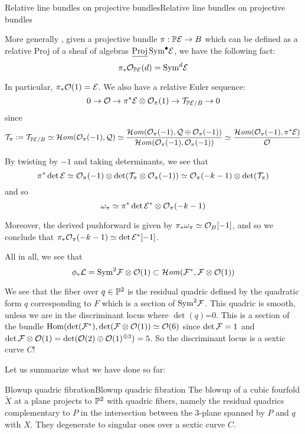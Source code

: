 \begin{remark}{Relative line bundles on projective bundles}{Relative line bundles on projective bundles}

    More generally \cite[Remark~13.36]{Wedhorn}, given a projective bundle $\pi:\P\calE \rightarrow B$ which can be defined as a relative Proj of a sheaf of algebras $\underline{\Proj}\, \mathrm{Sym}^\bullet \calE$, we have the following fact: $$\pi_* \O_{\P\calE}(d)=\mathrm{Sym}^d \calE$$ 

    In particular, $\pi_*\O(1)=\calE$. We also have a relative Euler sequence: $$0\rightarrow \O\rightarrow \pi^* \calE \otimes \O_{\pi}(1)\rightarrow \calT_{\P\calE/B}\rightarrow 0$$since $$\calT_\pi:=\calT_{\P\calE/B}\simeq \lHom(\O_{\pi}(-1),\mathcal{Q})\simeq \frac{\lHom(\O_{\pi}(-1),\mathcal{Q}\oplus \O_{\pi}(-1))}{\lHom (\O_{\pi}(-1), \O_{\pi}(-1))}\simeq \frac{\lHom(\O_{\pi}(-1), \pi^* \calE)}{ \O}$$  

    By twisting by $-1$ and taking determinants, we see that $$\pi^* \det \calE \simeq \O_\pi(-1) \otimes \det(\calT_\pi\otimes \O_\pi(-1))\simeq \O_\pi(-k-1) \otimes \det(\calT_\pi)$$and so $$\omega_\pi\simeq \pi^* \det \calE^* \otimes \O_{\pi}(-k-1)$$

    Moreover, the derived pushforward is given by $\pi_* \omega_\pi\simeq \O_B[-1]$, and so we conclude that $\pi_* \O_\pi(-k-1) \simeq \det \calE^*[-1]$. 
 \end{remark}

All in all, we see that $$\phi_* \calL = \mathrm{Sym}^2 \calF \otimes \O(1)\subset\lHom (\calF^* , \calF \otimes \O(1))$$

We see that the fiber over $q \in \P^2$ is the residual quadric defined by the quadratic form $q$ corresponding to $F$ which is a section of $\mathrm{Sym}^2\calF$. This quadric is smooth, unless we are in the discriminant locus where $\det(q)$=0. This is a section of the bundle $\Hom(\det(\calF^*), \det (\calF\otimes \O(1))\simeq \O(6) $ since $\det \calF=1$ and $\det \calF\otimes \O(1)= \det (\O(2) \oplus \O(1)^{\oplus 3})=5$. So the discriminant locus is a sextic curve $C$!

Let us summarize what we have done so far:

\begin{proposition}{Blowup quadric fibration}{Blowup quadric fibration}
    The blowup of a cubic fourfold $\tilde{X}$ at a plane projects to $\P^2$ with quadric fibers, namely the residual quadrics complementary to $P$ in the intersection between the 3-plane spanned by $P$ and $q$ with $X$. They degenerate to singular ones over a sextic curve $C$.
\end{proposition}


